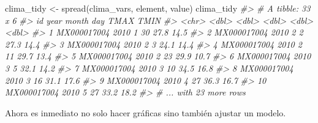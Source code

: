 \documentclass[
]{book}
\newenvironment{Shaded}{\begin{snugshade}}{\end{snugshade}}
\newcommand{\CommentTok}[1]{\textcolor[rgb]{0.56,0.35,0.01}{\textit{#1}}}
\newcommand{\FunctionTok}[1]{\textcolor[rgb]{0.00,0.00,0.00}{#1}}
\newcommand{\NormalTok}[1]{#1}
\newcommand{\OtherTok}[1]{\textcolor[rgb]{0.56,0.35,0.01}{#1}}
\begin{document}
\begin{Shaded}
\begin{Highlighting}[]
\NormalTok{clima\_tidy }\OtherTok{\textless{}{-}} \FunctionTok{spread}\NormalTok{(clima\_vars, element, value)}
\NormalTok{clima\_tidy}
\CommentTok{\#\textgreater{} \# A tibble: 33 x 6}
\CommentTok{\#\textgreater{}    id           year month   day  TMAX  TMIN}
\CommentTok{\#\textgreater{}    \textless{}chr\textgreater{}       \textless{}dbl\textgreater{} \textless{}dbl\textgreater{} \textless{}dbl\textgreater{} \textless{}dbl\textgreater{} \textless{}dbl\textgreater{}}
\CommentTok{\#\textgreater{}  1 MX000017004  2010     1    30  27.8  14.5}
\CommentTok{\#\textgreater{}  2 MX000017004  2010     2     2  27.3  14.4}
\CommentTok{\#\textgreater{}  3 MX000017004  2010     2     3  24.1  14.4}
\CommentTok{\#\textgreater{}  4 MX000017004  2010     2    11  29.7  13.4}
\CommentTok{\#\textgreater{}  5 MX000017004  2010     2    23  29.9  10.7}
\CommentTok{\#\textgreater{}  6 MX000017004  2010     3     5  32.1  14.2}
\CommentTok{\#\textgreater{}  7 MX000017004  2010     3    10  34.5  16.8}
\CommentTok{\#\textgreater{}  8 MX000017004  2010     3    16  31.1  17.6}
\CommentTok{\#\textgreater{}  9 MX000017004  2010     4    27  36.3  16.7}
\CommentTok{\#\textgreater{} 10 MX000017004  2010     5    27  33.2  18.2}
\CommentTok{\#\textgreater{} \# ... with 23 more rows}
\end{Highlighting}
\end{Shaded}

Ahora es inmediato no solo hacer gráficas sino también ajustar un modelo.
\end{document}
